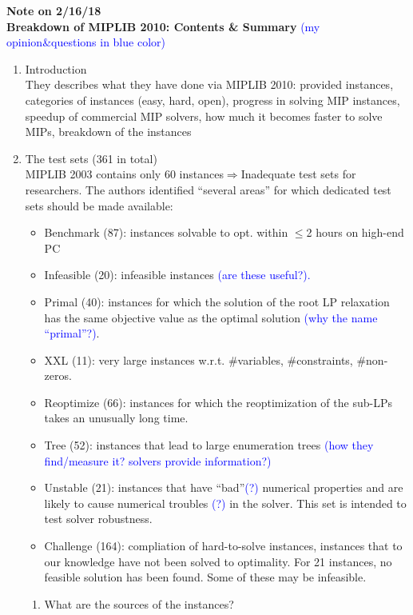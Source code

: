 \documentclass[11pt,english]{article}
\begin{document}
{\Large \textbf{Note on 2/16/18}}\\
\linebreak
\textbf{Breakdown of MIPLIB 2010: Contents \& Summary} \textcolor{blue}{(my opinion\&questions in blue color)}
\begin{enumerate}
	\item Introduction \\
	They describes what they have done via MIPLIB 2010: provided instances, categories of instances (easy, hard, open), progress in solving MIP instances, speedup of commercial MIP solvers, how much it becomes faster to solve MIPs, breakdown of the instances
	\item The test sets (361 in total)\\
	MIPLIB 2003 contains only 60 instances$\Rightarrow$Inadequate test sets for researchers. The authors identified ``several areas'' for which dedicated test sets should be made available:
	\begin{itemize}
		\item Benchmark (87): instances solvable to opt. within $\le$2 hours on high-end PC
		\item Infeasible (20): infeasible instances \textcolor{blue}{(are these useful?).}
		\item Primal (40): instances for which the solution of the root LP relaxation has the same objective value as the optimal solution \textcolor{blue}{(why the name ``primal''?)}.
		\item XXL (11): very large instances w.r.t. \#variables, \#constraints, \#non-zeros.
		\item Reoptimize (66): instances for which the reoptimization of the sub-LPs takes an unusually long time.
		\item Tree (52): instances that lead to large enumeration trees \textcolor{blue}{(how they find/measure it? solvers provide information?)}
		\item Unstable (21): instances that have ``bad''\textcolor{blue}{(?)} numerical properties and are likely to cause numerical troubles \textcolor{blue}{(?)} in the solver. This set is intended to test solver robustness. 
		\item Challenge (164): compliation of hard-to-solve instances, instances that to our knowledge have not been solved to optimality. For 21 instances, no feasible solution has been found. Some of these may be infeasible.
	\end{itemize}
	\begin{enumerate}
		\item What are the sources of the instances?\\

\end{enumerate}
\end{enumerate}
\end{document}
